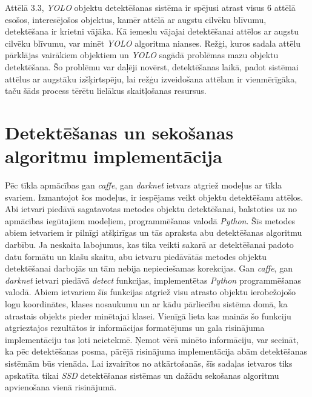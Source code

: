Attēlā 3.3, \textit{YOLO} objektu detektēšanas sistēma ir spējusi atrast visus 6 attēlā esošos, interesējošos objektus, kamēr attēlā ar augstu cilvēku blīvumu, detektēšana ir krietni vājāka. Kā iemeslu vājajai detektēšanai attēlos ar augstu cilvēku blīvumu, var minēt \textit{YOLO} algoritma nianses. Režģi, kuros sadala attēlu pārklājas vairākiem objektiem un \textit{YOLO} sagādā problēmas mazu objektu detektēšana. Šo problēmu var daļēji novērst, detektēšanas laikā, padot sistēmai attēlus ar augstāku izšķirtspēju, lai režģu izveidošana attēlam ir vienmērīgāka, taču šāds process tērētu lielākus skaitļošanas resursus. 
\section{Detektēšanas un sekošanas algoritmu implementācija}
Pēc tīkla apmācības gan \textit{caffe}, gan \textit{darknet} ietvars atgriež modeļus ar tīkla svariem. Izmantojot šos modeļus, ir iespējams veikt objektu detektēšanu attēlos. Abi ietvari piedāvā sagatavotas metodes objektu detektēšanai, balstoties uz no apmācības iegūtajiem modeļiem, programmēšanas valodā \textit{Python}. Šīs metodes abiem ietvariem ir pilnīgi atšķirīgas un tās apraksta abu detektēšanas algoritmu darbību. Ja neskaita labojumus, kas tika veikti sakarā ar detektēšanai padoto datu formātu un klašu skaitu, abu ietvaru piedāvātās metodes objektu detektēšanai darbojās un tām nebija nepieciešamas korekcijas. Gan \textit{caffe}, gan \textit{darknet} ietvari piedāvā \textit{detect} funkcijas, implementētas \textit{Python} programmēšanas valodā. Abiem ietvariem šīs funkcijas atgriež visu atrasto objektu ierobežojošo logu koordinātes, klases nosaukumu un ar kādu pārliecību sistēma domā, ka atrastais objekts pieder minētajai klasei. Vienīgā lieta kas mainās šo funkciju atgrieztajos rezultātos ir informācijas formatējums un gala risinājuma implementāciju tas ļoti neietekmē. Ņemot vērā minēto informāciju, var secināt, ka pēc detektēšanas posma, pārējā risinājuma implementācija abām detektēšanas sistēmām būs vienāda. Lai izvairītos no atkārtošanās, šīs sadaļas ietvaros tiks apskatīta tikai \textit{SSD} detektēšanas sistēmas un dažādu sekošanas algoritmu apvienošana vienā risinājumā.
